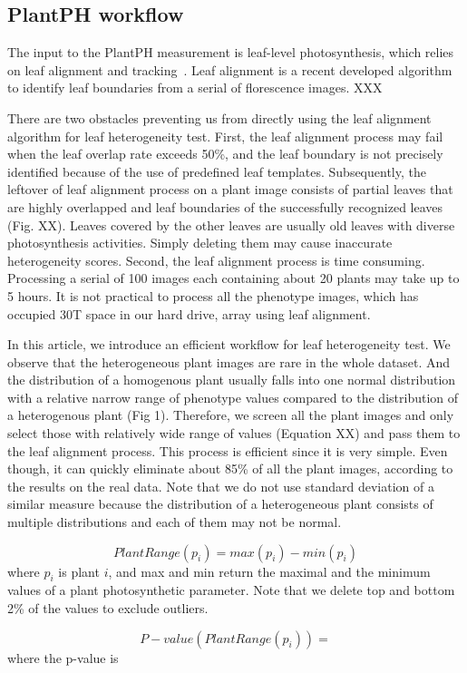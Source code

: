 \documentclass{bioinfo}
\begin{document}
\begin{methods}
\subsection{PlantPH workflow}

The input to the PlantPH measurement is leaf-level photosynthesis, which relies on leaf alignment and tracking~\citep{yin2014}. Leaf alignment is a recent developed algorithm to identify leaf boundaries from a serial of florescence images. XXX

There are two obstacles preventing us from directly using the leaf alignment algorithm for leaf heterogeneity test. First, the leaf alignment process may fail when the leaf overlap rate exceeds 50\%, and the leaf boundary is not precisely identified because of the use of predefined leaf templates. Subsequently, the leftover of leaf alignment process on a plant image consists of partial leaves that are highly overlapped and leaf boundaries of the successfully recognized leaves (Fig. XX). Leaves covered by the other leaves are usually old leaves with diverse photosynthesis activities. Simply deleting them may cause inaccurate heterogeneity scores. Second, the leaf alignment process is time consuming. Processing a serial of 100 images each containing about 20 plants may take up to 5 hours. It is not practical to process all the phenotype images, which has occupied 30T space in our hard drive, array using leaf alignment.

In this article, we introduce an efficient workflow for leaf heterogeneity test. We observe that the heterogeneous plant images are rare in the whole dataset. And the distribution of a homogenous plant usually falls into one normal distribution with a relative narrow range of phenotype values compared to the distribution of a heterogenous plant (Fig 1).
%
Therefore, we screen all the plant images and only select those with relatively wide range of values (Equation XX) and pass them to the leaf alignment process. This process is efficient since it is very simple. Even though, it can quickly eliminate about 85\% of all the plant images, according to the results on the real data. Note that we do not use standard deviation of a similar measure because the distribution of a heterogeneous plant consists of multiple distributions and each of them may not be normal.

\begin{equation}
PlantRange(p_i) = max(p_i) - min(p_i)
\end{equation}
\noindent where $p_i$ is plant $i$, and max and min return the maximal and the minimum values of a plant photosynthetic parameter. Note that we delete top and bottom 2\% of the values to exclude outliers.

\begin{equation}
P-value(PlantRange(p_i)) =
\end{equation}
\noindent where the p-value is


\end{methods}
\end{document}
